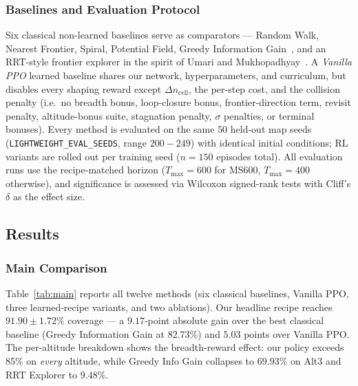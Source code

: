 \documentclass[conference]{IEEEtran}
\begin{document}
\subsubsection{Baselines and Evaluation Protocol}
Six classical non-learned baselines serve as comparators --- Random Walk, Nearest Frontier, Spiral, Potential Field, Greedy Information Gain~\cite{placed2023survey}, and an RRT-style frontier explorer in the spirit of Umari and Mukhopadhyay~\cite{placed2023survey}. A \emph{Vanilla PPO} learned baseline shares our network, hyperparameters, and curriculum, but disables every shaping reward except $\Delta n_{\text{cell}}$, the per-step cost, and the collision penalty (i.e.\ no breadth bonus, loop-closure bonus, frontier-direction term, revisit penalty, altitude-bonus suite, stagnation penalty, $\sigma$ penalties, or terminal bonuses). Every method is evaluated on the same $50$ held-out map seeds (\texttt{LIGHTWEIGHT\_EVAL\_SEEDS}, range $200{-}249$) with identical initial conditions; RL variants are rolled out per training seed ($n\!=\!150$ episodes total). All evaluation runs use the recipe-matched horizon ($T_{\max}\!=\!600$ for MS600, $T_{\max}\!=\!400$ otherwise), and significance is assessed via Wilcoxon signed-rank tests with Cliff's $\delta$ as the effect size.

\subsection{Results}\label{sec:results}

\subsubsection{Main Comparison}
Table~\ref{tab:main} reports all twelve methods (six classical baselines, Vanilla PPO, three learned-recipe variants, and two ablations). Our headline recipe reaches $91.90\!\pm\!1.72\%$ coverage --- a $9.17$-point absolute gain over the best classical baseline (Greedy Information Gain at $82.73\%$) and $5.03$ points over Vanilla PPO. The per-altitude breakdown shows the breadth-reward effect: our policy exceeds $85\%$ on \emph{every} altitude, while Greedy Info Gain collapses to $69.93\%$ on Alt3 and RRT Explorer to $9.48\%$.
\end{document}
